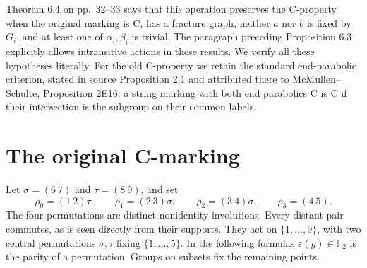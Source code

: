 \documentclass[11pt,a4paper]{article}
\newcommand{\eps}{\varepsilon}\newtheorem{proposition}{Proposition}
\begin{document}
Theorem 6.4 on pp.~32--33 says that this operation preserves the C-property
when the original marking is C, has a fracture graph, neither $a$ nor $b$
is fixed by $G_i$, and at least one of $\alpha_i,\beta_i$ is trivial.
The paragraph preceding Proposition 6.3 explicitly allows intransitive
actions in these results. We verify all these hypotheses literally.
For the old C-property we retain the standard end-parabolic criterion,
stated in source Proposition 2.1 and attributed there to
McMullen--Schulte, Proposition 2E16: a string marking with both end
parabolics C is C if their intersection is the subgroup on their common
labels.

\section{The original C-marking}
Let $\sigma=(6\ 7)$ and $\tau=(8\ 9)$, and set
\begin{equation}\label{eq:old}
 \rho_0=(1\ 2)\tau,\qquad
 \rho_1=(2\ 3)\sigma,\qquad
 \rho_2=(3\ 4)\sigma,\qquad
 \rho_3=(4\ 5).
\end{equation}
The four permutations are distinct nonidentity involutions. Every distant
pair commutes, as is seen directly from their supports. They act on
$\{1,\ldots,9\}$, with two central permutations $\sigma,\tau$ fixing
$\{1,\ldots,5\}$. In the following formulas $\eps(g)\in\mathbb F_2$
is the parity of a permutation. Groups on subsets fix the remaining points.
\end{document}
